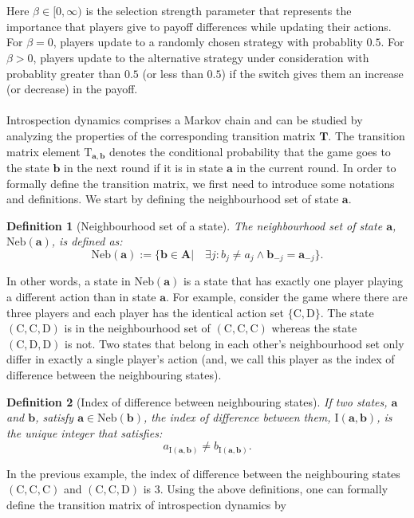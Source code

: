 \documentclass[11pt]{article}
\theoremstyle{plainCl1}
\newtheorem{definition}{Definition}
\theoremstyle{plainCl2}
\newcommand{\A}{\mathbf{A}}
\newcommand{\abf}{\mathbf{a}}
\newcommand{\bbf}{\mathbf{b}}
\newcommand{\T}{\mathbf{T}}
\newcommand{\C}{\mathrm{C}}
\newcommand{\D}{\mathrm{D}}
\begin{document}
\\ \\ \noindent Here $\beta \in [0,\infty)$ is the selection strength parameter that represents the importance that players give to payoff differences while updating their actions. For $\beta = 0$, players update to a randomly chosen strategy with probablity $0.5$. For $\beta > 0$, players update to the alternative strategy under consideration with probablity greater than $0.5$ (or less than $0.5$) if the switch gives them an increase (or decrease) in the payoff. \\ \\ 
\noindent Introspection dynamics comprises a Markov chain and can be studied by analyzing the properties of the corresponding transition matrix $\T$. The transition matrix element $\mathrm{T}_{\abf,\bbf}$ denotes the conditional probability that the game goes to the state $\bbf$ in the next round if it is in state $\abf$ in the current round. In order to formally define the transition matrix, we first need to introduce some notations and definitions. We start by defining the neighbourhood set of state $\abf$.

\begin{definition}[Neighbourhood set of a state] The neighbourhood set of state $\abf$, $\mathrm{Neb}(\abf)$, is defined as:
\begin{equation}
\mathrm{Neb}(\abf) := \{\bbf \in \A  \big| \quad \exists j:  b_{j} \neq a_{j} \land \bbf_{-j} = \abf_{-j}  \}.
\label{Eq:neighbourhood-states}
\end{equation} 
\label{Def:neighbourhood-states}
\end{definition} 
\noindent In other words, a state in $\mathrm{Neb}(\abf)$ is a state that has exactly one player playing a different action than in state $\abf$. For example, consider the game where there are  three players and each player has the identical action set $\{\C, \D \}$.  The state $(\C,\C,\D)$ is in the neighbourhood set of $(\C,\C,\C)$ whereas the state $(\C,\D,\D)$ is not. Two states that belong in each other's neighbourhood set only differ in exactly a single player's action (and, we call this player as the index of difference between the neighbouring states).

\begin{definition} [Index of difference between neighbouring states] If two states, $\abf$ and $\bbf$, satisfy $\abf \in \mathrm{Neb}(\bbf)$, the index of difference between them, $\mathrm{I}(\abf, \bbf)$, is the unique integer that satisfies:
\begin{equation}
a_{\mathrm{I}(\abf, \bbf)} \neq b_{\mathrm{I}(\abf, \bbf)}.
\end{equation} 
\label{Def:index-of-difference}
\end{definition} 
\noindent In the previous example, the index of difference between the neighbouring states $(\C,\C,\C)$ and $(\C,\C,\D)$ is $3$. Using the above definitions, one can formally define the transition matrix of introspection dynamics by
\end{document}

